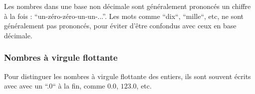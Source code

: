 Les nombres dans une base non décimale sont généralement prononcés un chiffre à
la fois : ``un-zéro-zéro-un-un-...''. Les mots comme ``dix``, ``mille``, etc, ne
sont généralement pas prononcés, pour éviter d'être confondus avec ceux en
base décimale.

\subsubsection{Nombres à virgule flottante}

Pour distinguer les nombres à virgule flottante des entiers, ils sont souvent écrits
avec avec un ``.0`` à la fin, comme $0.0$, $123.0$, etc.
